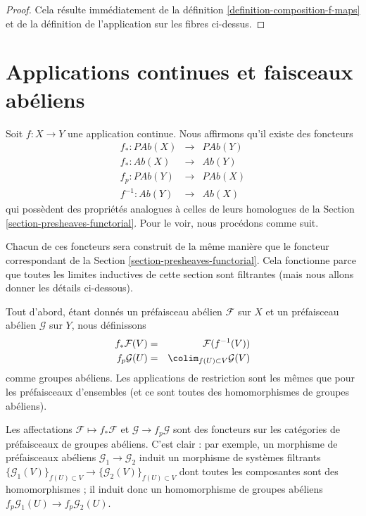 \begin{proof}
Cela résulte immédiatement de la définition \ref{definition-composition-f-maps}
et de la définition de l'application sur les fibres ci-dessus.
\end{proof}
\section{Applications continues et faisceaux abéliens}
\label{section-abelian-presheaves-functorial}

\noindent
Soit $f : X \to Y$ une application continue.
Nous affirmons qu'il existe des foncteurs
\begin{eqnarray*}
f_* : \textit{PAb}(X) & \longrightarrow & \textit{PAb}(Y) \\
f_* : \textit{Ab}(X) & \longrightarrow & \textit{Ab}(Y) \\
f_p : \textit{PAb}(Y) & \longrightarrow & \textit{PAb}(X) \\
f^{-1} : \textit{Ab}(Y) & \longrightarrow & \textit{Ab}(X)
\end{eqnarray*}
qui possèdent des propriétés analogues à celles de leurs homologues de la
Section \ref{section-presheaves-functorial}.
Pour le voir, nous procédons comme suit.

\medskip\noindent
Chacun de ces foncteurs sera construit de la même
manière que le foncteur correspondant de la
Section \ref{section-presheaves-functorial}.
Cela fonctionne parce que toutes les limites inductives de cette section
sont filtrantes (mais nous allons donner les détails ci-dessous).

\medskip\noindent
Tout d'abord, étant donnés un préfaisceau abélien $\mathcal{F}$ sur $X$ et
un préfaisceau abélien $\mathcal{G}$ sur $Y$, nous définissons
\begin{eqnarray*}
f_*\mathcal{F}(V) & = & \mathcal{F}(f^{-1}(V)) \\
f_p\mathcal{G}(U) & = & \colim_{f(U) \subset V} \mathcal{G}(V)
\end{eqnarray*}
comme groupes abéliens. Les applications de restriction sont les mêmes que
pour les préfaisceaux d'ensembles (et ce sont
toutes des homomorphismes de groupes abéliens).

\medskip\noindent
Les affectations $\mathcal{F} \mapsto f_*\mathcal{F}$ et
$\mathcal{G} \to f_p\mathcal{G}$ sont des foncteurs sur
les catégories de préfaisceaux de groupes abéliens.
C'est clair : par exemple, un morphisme de préfaisceaux abéliens
$\mathcal{G}_1 \to \mathcal{G}_2$ induit un morphisme de
systèmes filtrants
$\{\mathcal{G}_1(V)\}_{f(U) \subset V} \to
\{\mathcal{G}_2(V)\}_{f(U) \subset V}$
dont toutes les composantes sont des homomorphismes ;
il induit donc un homomorphisme de groupes abéliens
$f_p\mathcal{G}_1(U) \to f_p\mathcal{G}_2(U)$.

